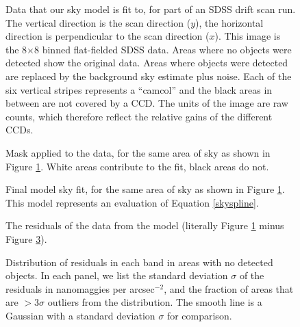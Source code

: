 \clearpage

\setcounter{thefigs}{0}

\clearpage
{}
\begin{figure}
\figurenum{\fignum}
\caption{\label{fig:rawrun} Data that our sky model is fit to, for
part of an SDSS drift scan run.  The vertical direction is the scan
direction ($y$), the horizontal direction is perpendicular to the scan
direction ($x$). This image is the 8$\times$8 binned flat-fielded SDSS
data. Areas where no objects were detected show the original data.
Areas where objects were detected are replaced by the background sky
estimate plus noise. Each of the six vertical stripes represents a
``camcol'' and the black areas in between are not covered by a
CCD. The units of the image are raw counts, which therefore reflect
the relative gains of the different CCDs. }
\end{figure}

\clearpage
{}
\begin{figure}
\figurenum{\fignum}
\caption{\label{fig:mask} Mask applied to the data, for the same area
of sky as shown in Figure \ref{fig:rawrun}. White areas contribute to
the fit, black areas do not.}
\end{figure}

\clearpage
{}
\begin{figure}
\figurenum{\fignum}
\caption{\label{fig:model} Final model sky fit, for the same area of
sky as shown in Figure \ref{fig:rawrun}. This model represents an
evaluation of Equation \ref{skyspline}.}
\end{figure}

\clearpage
{}
\begin{figure}
\figurenum{\fignum}
\caption{\label{fig:resid} The residuals of the data from the model
(literally Figure \ref{fig:rawrun} minus Figure \ref{fig:model}).}
\end{figure}

\clearpage
{}
\begin{figure}
\figurenum{\fignum}
\caption{\label{fig:skyqa} Distribution of residuals in each band in
  areas with no detected objects. In each panel, we list the standard
  deviation $\sigma$ of the residuals in nanomaggies per
  arcsec$^{-2}$, and the fraction of areas that are $>3\sigma$
  outliers from the distribution. The smooth line is a Gaussian with a
  standard deviation $\sigma$ for comparison. }
\end{figure}


